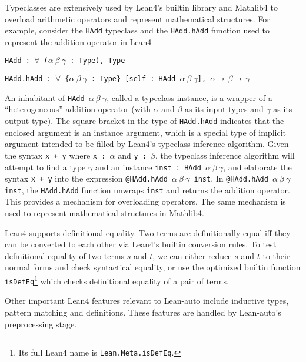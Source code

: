   Typeclasses are extensively used by Lean4's builtin library and Mathlib4 to
  overload arithmetic operators and represent mathematical structures. For example,
  consider the \texttt{HAdd} typeclass and the \texttt{HAdd.hAdd} function
  used to represent the addition operator in Lean4
  
  \centerline{\texttt{HAdd : $\forall$ ($\alpha \ \beta \ \gamma$ : Type), Type}}
  \centerline{\texttt{HAdd.hAdd : $\forall$ \{$\alpha \ \beta \ \gamma$ : Type\} [self : HAdd $\alpha \ \beta \ \gamma$], $\alpha$ → $\beta$ → $\gamma$}}

  \noindent An inhabitant of \texttt{HAdd $\alpha \ \beta \ \gamma$}, called a
  typeclass instance, is a wrapper of a ``heterogeneous'' addition operator (with $\alpha$ and $\beta$ as its input types and
  $\gamma$ as its output type). The square bracket in the type of \texttt{HAdd.hAdd}
  indicates that the enclosed argument is an instance argument, which is a special type
  of implicit argument intended to be filled by Lean4's typeclass inference algorithm.
  Given the syntax \texttt{x + y} where \texttt{x : $\alpha$} and \texttt{y : $\beta$},
  the typeclass inference algorithm will attempt to find a type $\gamma$ and
  an instance \texttt{inst : HAdd $\alpha \ \beta \ \gamma$}, and elaborate the
  syntax \texttt{x + y} into the expression \texttt{@HAdd.hAdd $\alpha \ \beta \ \gamma$ inst}.
  In \texttt{@HAdd.hAdd $\alpha \ \beta \ \gamma$ inst}, the \texttt{HAdd.hAdd} function
  unwraps \texttt{inst} and returns the addition operator. This provides a mechanism
  for overloading operators. The same mechanism is used to represent mathematical
  structures in Mathlib4.

  Lean4 supports definitional equality. Two terms are definitionally equal
  iff they can be converted to each other via Lean4's builtin conversion rules.
  To test definitional equality of two terms $s$ and $t$, we can either reduce $s$ and
  $t$ to their normal forms and check syntactical equality, or use the optimized
  builtin function \texttt{isDefEq}\footnote{Its full Lean4 name is \texttt{Lean.Meta.isDefEq}.}
  which checks definitional equality of a pair of terms.

  Other important Lean4 features relevant to Lean-auto include inductive types, pattern matching and definitions.
  These features are handled by Lean-auto's preprocessing stage.
